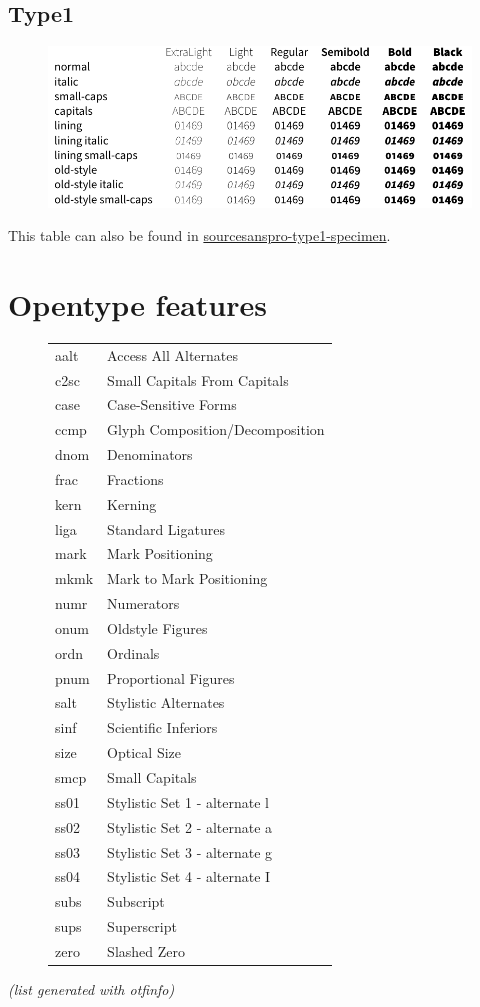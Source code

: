 \documentclass[10pt,a4paper,english]{article}
\newcommand*\file[1]{\href{run:#1.pdf}{#1}}
\begin{document}
\subsection{Type1}
\begin{figure}[ht]
	\centering
	\includegraphics{sourcesanspro-type1-specimen}
\end{figure}
This table can also be found in \file{sourcesanspro-type1-specimen}.

\newpage
\section{Opentype features}
\label{sec:otfinfo}

\begin{figure}[ht]
	\centering
	\begin{tabular}{>{\ttfamily}l l}
		aalt & Access All Alternates \\
		c2sc & Small Capitals From Capitals \\
		case & Case-Sensitive Forms \\
		ccmp & Glyph Composition/Decomposition \\
		dnom & Denominators \\
		frac & Fractions \\
		kern & Kerning \\
		liga & Standard Ligatures \\
		mark & Mark Positioning \\
		mkmk & Mark to Mark Positioning \\
		numr & Numerators \\
		onum & Oldstyle Figures \\
		ordn & Ordinals \\
		pnum & Proportional Figures \\
		salt & Stylistic Alternates \\
		sinf & Scientific Inferiors \\
		size & Optical Size \\
		smcp & Small Capitals \\
		ss01 & Stylistic Set 1 - alternate l \\
		ss02 & Stylistic Set 2 - alternate a \\
		ss03 & Stylistic Set 3 - alternate g \\
		ss04 & Stylistic Set 4 - alternate I \\
		subs & Subscript \\
		sups & Superscript \\
		zero & Slashed Zero
	\end{tabular}
\end{figure}
\textit{(list generated with otfinfo)}
\end{document}
